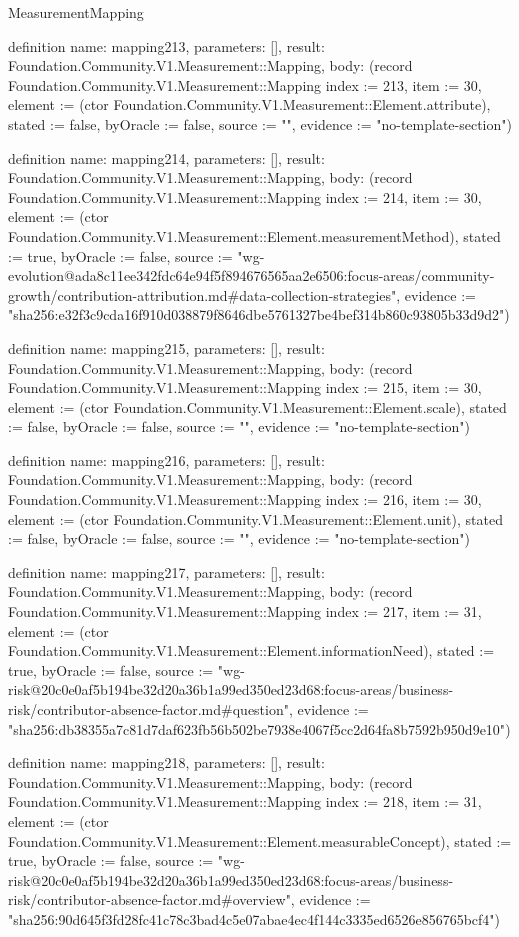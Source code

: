\begin{lexlean}{MeasurementMapping}
\begin{semanticmodule}
definition{
  name: mapping213,
  parameters: [],
  result: Foundation.Community.V1.Measurement::Mapping,
  body: (record Foundation.Community.V1.Measurement::Mapping {index := 213, item := 30, element := (ctor Foundation.Community.V1.Measurement::Element.attribute), stated := false, byOracle := false, source := "", evidence := "no-template-section"})
}

definition{
  name: mapping214,
  parameters: [],
  result: Foundation.Community.V1.Measurement::Mapping,
  body: (record Foundation.Community.V1.Measurement::Mapping {index := 214, item := 30, element := (ctor Foundation.Community.V1.Measurement::Element.measurementMethod), stated := true, byOracle := false, source := "wg-evolution@ada8c11ee342fdc64e94f5f894676565aa2e6506:focus-areas/community-growth/contribution-attribution.md#data-collection-strategies", evidence := "sha256:e32f3c9cda16f910d038879f8646dbe5761327be4bef314b860c93805b33d9d2"})
}

definition{
  name: mapping215,
  parameters: [],
  result: Foundation.Community.V1.Measurement::Mapping,
  body: (record Foundation.Community.V1.Measurement::Mapping {index := 215, item := 30, element := (ctor Foundation.Community.V1.Measurement::Element.scale), stated := false, byOracle := false, source := "", evidence := "no-template-section"})
}

definition{
  name: mapping216,
  parameters: [],
  result: Foundation.Community.V1.Measurement::Mapping,
  body: (record Foundation.Community.V1.Measurement::Mapping {index := 216, item := 30, element := (ctor Foundation.Community.V1.Measurement::Element.unit), stated := false, byOracle := false, source := "", evidence := "no-template-section"})
}

definition{
  name: mapping217,
  parameters: [],
  result: Foundation.Community.V1.Measurement::Mapping,
  body: (record Foundation.Community.V1.Measurement::Mapping {index := 217, item := 31, element := (ctor Foundation.Community.V1.Measurement::Element.informationNeed), stated := true, byOracle := false, source := "wg-risk@20c0e0af5b194be32d20a36b1a99ed350ed23d68:focus-areas/business-risk/contributor-absence-factor.md#question", evidence := "sha256:db38355a7c81d7daf623fb56b502be7938e4067f5cc2d64fa8b7592b950d9e10"})
}

definition{
  name: mapping218,
  parameters: [],
  result: Foundation.Community.V1.Measurement::Mapping,
  body: (record Foundation.Community.V1.Measurement::Mapping {index := 218, item := 31, element := (ctor Foundation.Community.V1.Measurement::Element.measurableConcept), stated := true, byOracle := false, source := "wg-risk@20c0e0af5b194be32d20a36b1a99ed350ed23d68:focus-areas/business-risk/contributor-absence-factor.md#overview", evidence := "sha256:90d645f3fd28fc41c78c3bad4c5e07abae4ec4f144c3335ed6526e856765bcf4"})
}


\end{semanticmodule}
\end{lexlean}
